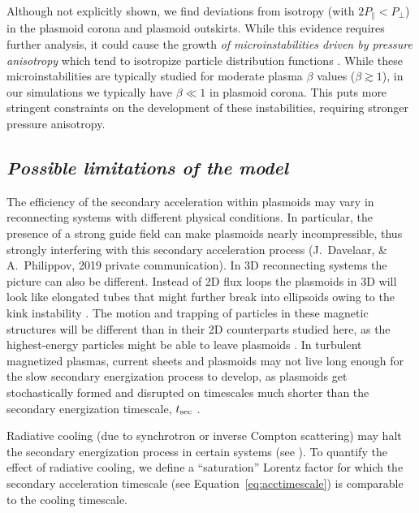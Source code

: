 Although not explicitly shown, we find deviations from isotropy (with $2P_{\parallel}<P_{\perp}$) in the plasmoid corona and plasmoid outskirts. While this evidence requires further analysis, it could cause the growth {\it of microinstabilities driven by pressure anisotropy} which tend to isotropize particle distribution functions \citep[e.g.,][]{2014PhRvL.112t5003K}. While these microinstabilities are typically studied for moderate plasma $\beta$ values ($\beta\gtrsim 1$), in our simulations we typically have $\beta\ll 1$ in plasmoid corona. This puts more stringent constraints on the development of these instabilities, requiring stronger pressure anisotropy.

\subsection*{\small\it Possible limitations of the model} 
The efficiency of the secondary acceleration within plasmoids may vary in reconnecting systems with different physical conditions. In particular, the presence of a strong guide field can make plasmoids nearly incompressible, thus strongly interfering with this secondary acceleration process (J.~Davelaar, \& A.~Philippov, 2019 private communication). In 3D reconnecting systems the picture can also be different. Instead of 2D flux loops the plasmoids in 3D will look like elongated tubes that might further break into ellipsoids owing to the kink instability \citep[e.g.,][]{2011PhPl...18e2105L, 2014ApJ...783L..21S}. The motion and trapping of particles in these magnetic structures will be different than in their 2D counterparts studied here, as the highest-energy particles might be able to leave plasmoids \citep[e.g.,][]{2019ApJ...884..118L}. In turbulent magnetized plasmas, current sheets and plasmoids may not live long enough for the slow secondary energization process to develop, as plasmoids get stochastically formed and disrupted on timescales much shorter than the secondary energization timescale, $t_{\rm sec}$ \citep[e.g.,][]{2017PhRvL.118e5103Z, 2018PhRvL.121y5101C}.

Radiative cooling (due to synchrotron or inverse Compton scattering) may halt the secondary energization process in certain systems (see \citealt{2018JPlPh..84c7501N, 2019ApJ...877...53H, 2019MNRAS.482L..60W}). To quantify the effect of radiative cooling, we define a ``saturation'' Lorentz factor for which the secondary acceleration timescale (see Equation~\eqref{eq:acctimescale}) is comparable to the cooling timescale.

